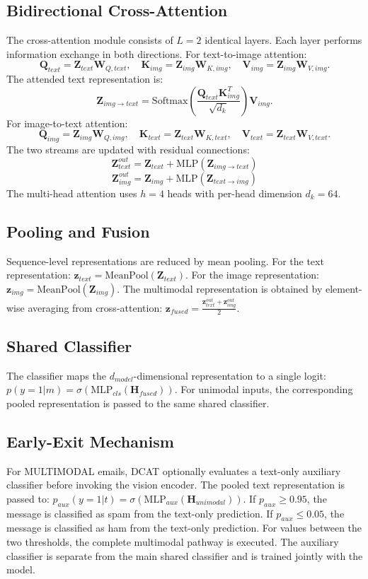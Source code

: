 \documentclass[conference]{IEEEtran}
\begin{document}
\subsection{Bidirectional Cross-Attention}
The cross-attention module consists of $L=2$ identical layers. Each layer performs information exchange in both directions.
For text-to-image attention:
\[
\mathbf{Q}_{text} = \mathbf{Z}_{text}\mathbf{W}_{Q,text}, \quad \mathbf{K}_{img} = \mathbf{Z}_{img}\mathbf{W}_{K,img}, \quad \mathbf{V}_{img} = \mathbf{Z}_{img}\mathbf{W}_{V,img}.
\]
The attended text representation is:
\[
\mathbf{Z}_{img \rightarrow text} = \text{Softmax} \left( \frac{ \mathbf{Q}_{text} \mathbf{K}_{img}^{T} }{ \sqrt{d_k} } \right) \mathbf{V}_{img}.
\]
For image-to-text attention:
\[
\mathbf{Q}_{img} = \mathbf{Z}_{img}\mathbf{W}_{Q,img}, \quad \mathbf{K}_{text} = \mathbf{Z}_{text}\mathbf{W}_{K,text}, \quad \mathbf{V}_{text} = \mathbf{Z}_{text}\mathbf{W}_{V,text}.
\]
The two streams are updated with residual connections:
\[
\mathbf{Z}_{text}^{out} = \mathbf{Z}_{text} + \text{MLP}(\mathbf{Z}_{img \rightarrow text})
\]
\[
\mathbf{Z}_{img}^{out} = \mathbf{Z}_{img} + \text{MLP}(\mathbf{Z}_{text \rightarrow img})
\]
The multi-head attention uses $h=4$ heads with per-head dimension $d_k = 64$.
\subsection{Pooling and Fusion}
Sequence-level representations are reduced by mean pooling.
For the text representation: $\mathbf{z}_{text} = \text{MeanPool}(\mathbf{Z}_{text}).$
For the image representation: $\mathbf{z}_{img} = \text{MeanPool}(\mathbf{Z}_{img}).$
The multimodal representation is obtained by element-wise averaging from cross-attention:
$\mathbf{z}_{fused} = \frac{ \mathbf{z}_{text}^{out} + \mathbf{z}_{img}^{out} }{2}.$
\subsection{Shared Classifier}
The classifier maps the $d_{model}$-dimensional representation to a single logit:
$p(y=1|m) = \sigma \left( \text{MLP}_{cls}(\mathbf{H}_{fused}) \right).$
For unimodal inputs, the corresponding pooled representation is passed to the same shared classifier.
\subsection{Early-Exit Mechanism}
For MULTIMODAL emails, DCAT optionally evaluates a text-only auxiliary classifier before invoking the vision encoder.
The pooled text representation is passed to:
$p_{aux}(y=1|t) = \sigma \left( \text{MLP}_{aux}(\mathbf{H}_{unimodal}) \right).$
If $p_{aux} \geq 0.95$, the message is classified as spam from the text-only prediction.
If $p_{aux} \leq 0.05$, the message is classified as ham from the text-only prediction.
For values between the two thresholds, the complete multimodal pathway is executed.
The auxiliary classifier is separate from the main shared classifier and is trained jointly with the model.
\end{document}
